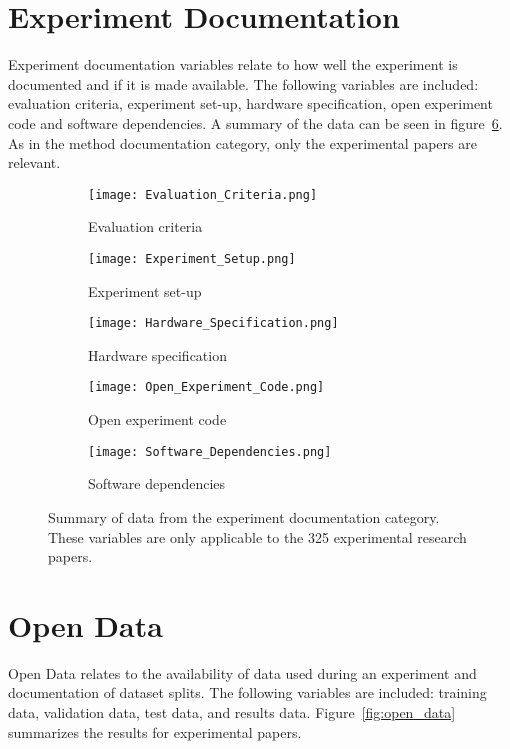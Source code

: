 \section{Experiment Documentation}
Experiment documentation variables relate to how well the experiment is documented and if it is made available. The following variables are included: evaluation criteria, experiment set-up, hardware specification, open experiment code and software dependencies. A summary of the data can be seen in figure~\ref{fig:experiment_documentation}. As in the method documentation category, only the experimental papers are relevant.
\begin{figure}[!h]
\begin{center}
    \begin{subfigure}[b]{0.4\textwidth}
        \texttt{[image: Evaluation\_Criteria.png]}
        \caption{Evaluation criteria}
        \label{fig:evaluation_criteria}
    \end{subfigure}
    \begin{subfigure}[b]{0.4\textwidth}
        \texttt{[image: Experiment\_Setup.png]}
        \caption{Experiment set-up}
        \label{fig:experiment_setup}
    \end{subfigure}
    \begin{subfigure}[b]{0.4\textwidth}
        \texttt{[image: Hardware\_Specification.png]}
        \caption{Hardware specification}
        \label{fig:hardware_specification}
    \end{subfigure}
    \begin{subfigure}[b]{0.4\textwidth}
        \texttt{[image: Open\_Experiment\_Code.png]}
        \caption{Open experiment code}
        \label{fig:open_experiment_code}
    \end{subfigure}
    \begin{subfigure}[b]{0.4\textwidth}
        \texttt{[image: Software\_Dependencies.png]}
        \caption{Software dependencies}
        \label{fig:software_dependencies}
    \end{subfigure}
    \caption[Summary of experiment documentation data.]{Summary of data from the experiment documentation category. These variables are only applicable to the 325 experimental research papers.}
    \label{fig:experiment_documentation}
\end{center}
\end{figure}

\section{Open Data}
Open Data relates to the availability of data used during an experiment and documentation of dataset splits. The following variables are included: training data, validation data, test data, and results data. Figure~\ref{fig:open_data} summarizes the results for experimental papers.

